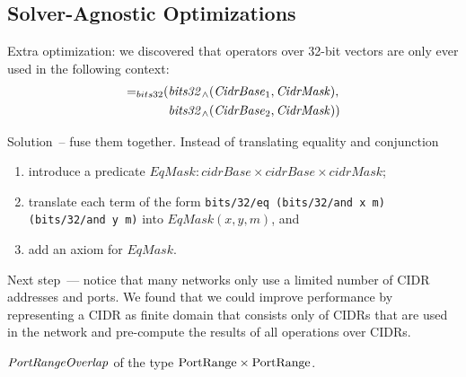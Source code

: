 \subsection{Solver-Agnostic Optimizations}
Extra optimization: we discovered that operators over 32-bit vectors are only ever used in the following context:
\begin{equation*}
\begin{aligned}
\mathit{=}_{bits32}(&\mathit{bits32}_{\wedge}(\mathit{CidrBase}_1,\mathit{CidrMask}), \\
                   &\mathit{bits32}_{\wedge}(\mathit{CidrBase}_2,\mathit{CidrMask}))
\end{aligned}
\end{equation*}

Solution~-- fuse them together. Instead of translating equality and conjunction
\begin{enumerate}
  \item introduce a predicate $\mathit{EqMask}: \mathit{cidrBase}\times\mathit{cidrBase}\times\mathit{cidrMask}$;
  \item translate each term of the form \texttt{bits/32/eq (bits/32/and x m) (bits/32/and y m)} into $\mathit{EqMask}(x, y, m)$, and
  \item add an axiom for $\mathit{EqMask}$.
\end{enumerate}

Next step~--- notice that many networks only use a limited number of CIDR addresses and ports. We found that we could improve performance by representing a CIDR as finite domain that consists only of CIDRs that are used in the network and pre-compute the results of all operations over CIDRs.

$\mathit{PortRangeOverlap}$ of the type $\mathrm{PortRange} \times \mathrm{PortRange}$.

